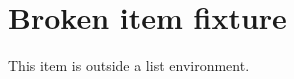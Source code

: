 \documentclass{article}
\begin{document}
\section{Broken item fixture}
\item This item is outside a list environment.
\end{document}
